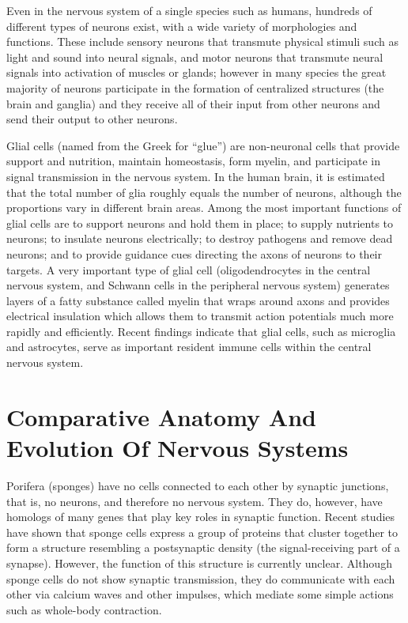 Even in the nervous system of a single species such as humans, hundreds of different types of neurons exist, with a wide variety of morphologies and functions. These include sensory neurons that transmute physical stimuli such as light and sound into neural signals, and motor neurons that transmute neural signals into activation of muscles or glands; however in many species the great majority of neurons participate in the formation of centralized structures (the brain and ganglia) and they receive all of their input from other neurons and send their output to other neurons.

Glial cells (named from the Greek for ``glue'') are non-neuronal cells that provide support and nutrition, maintain homeostasis, form myelin, and participate in signal transmission in the nervous system. In the human brain, it is estimated that the total number of glia roughly equals the number of neurons, although the proportions vary in different brain areas. Among the most important functions of glial cells are to support neurons and hold them in place; to supply nutrients to neurons; to insulate neurons electrically; to destroy pathogens and remove dead neurons; and to provide guidance cues directing the axons of neurons to their targets. A very important type of glial cell (oligodendrocytes in the central nervous system, and Schwann cells in the peripheral nervous system) generates layers of a fatty substance called myelin that wraps around axons and provides electrical insulation which allows them to transmit action potentials much more rapidly and efficiently. Recent findings indicate that glial cells, such as microglia and astrocytes, serve as important resident immune cells within the central nervous system.

\hypertarget{comparative-anatomy-and-evolution-of-nervous-systems}{%
\section{Comparative Anatomy And Evolution Of Nervous Systems}\label{comparative-anatomy-and-evolution-of-nervous-systems}}

Porifera (sponges) have no cells connected to each other by synaptic junctions, that is, no neurons, and therefore no nervous system. They do, however, have homologs of many genes that play key roles in synaptic function. Recent studies have shown that sponge cells express a group of proteins that cluster together to form a structure resembling a postsynaptic density (the signal-receiving part of a synapse). However, the function of this structure is currently unclear. Although sponge cells do not show synaptic transmission, they do communicate with each other via calcium waves and other impulses, which mediate some simple actions such as whole-body contraction.

